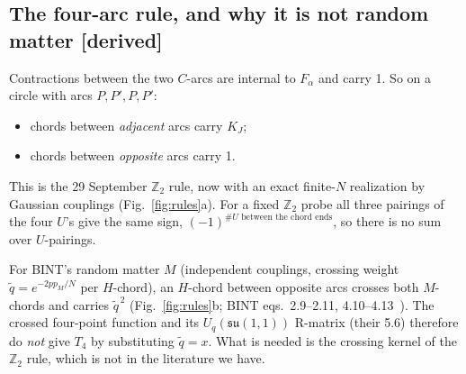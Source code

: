 \documentclass[11pt]{article}
\newcommand{\tagbox}[2]{\textsf{\small\color{#1}[#2]}}
\newcommand{\DER}{\tagbox{cder}{derived}}
\theoremstyle{remark}
\begin{document}
\subsection{The four-arc rule, and why it is not random matter \DER}
Contractions between the two $C$-arcs are internal to $F_\alpha$ and carry 1. So on a circle with arcs
$P,P',P,P'$:
\begin{itemize}\itemsep1pt
\item chords between \emph{adjacent} arcs carry $K_J$;
\item chords between \emph{opposite} arcs carry 1.
\end{itemize}
This is the 29 September $\mathbb Z_2$ rule, now with an exact finite-$N$ realization by Gaussian couplings
(Fig.~\ref{fig:rules}a). For a fixed $\mathbb Z_2$ probe all three pairings of the four $U$'s give the same sign,
$(-1)^{\#U\text{ between the chord ends}}$, so there is no sum over $U$-pairings.

For BINT's random matter $M$ (independent couplings, crossing weight $\tilde q=e^{-2pp_M/N}$ per $H$-chord), an $H$-chord
between opposite arcs crosses both $M$-chords and carries $\tilde q^{\,2}$ (Fig.~\ref{fig:rules}b; BINT eqs.~2.9--2.11,
4.10--4.13~\cite{BINT}). The crossed four-point function and its $U_q(\mathfrak{su}(1,1))$ R-matrix (their 5.6) therefore
do \emph{not} give $T_4$ by substituting $\tilde q=x$. What is needed is the crossing kernel of the $\mathbb Z_2$ rule,
which is not in the literature we have.
\end{document}
